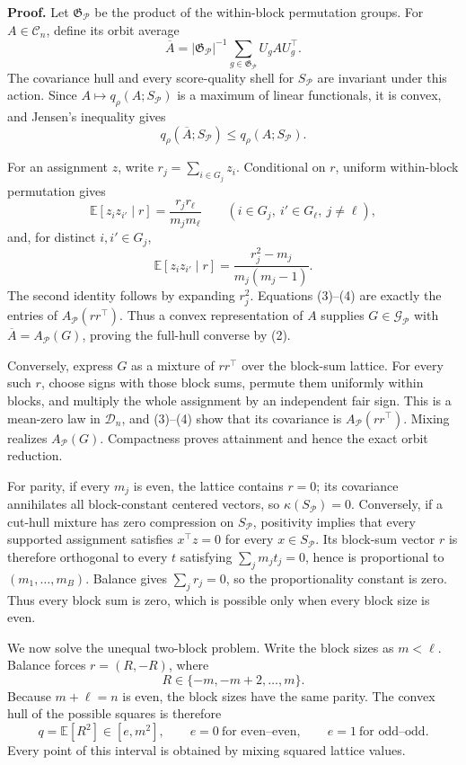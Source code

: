 \textbf{Proof.}
Let \(\mathfrak G_{\mathcal P}\) be the product of the within-block permutation groups.  For \(A\in\mathcal C_n\), define its orbit average
\[
\overline A=|\mathfrak G_{\mathcal P}|^{-1}
\sum_{g\in\mathfrak G_{\mathcal P}}U_gAU_g^\top.
\tag{1}
\]
The covariance hull and every score-quality shell for \(S_{\mathcal P}\) are invariant under this action.  Since \(A\mapsto q_\rho(A;S_{\mathcal P})\) is a maximum of linear functionals, it is convex, and Jensen's inequality gives
\[
q_\rho(\overline A;S_{\mathcal P})\leq q_\rho(A;S_{\mathcal P}).
\tag{2}
\]

For an assignment \(z\), write \(r_j=\sum_{i\in G_j}z_i\).  Conditional on \(r\), uniform within-block permutation gives
\[
\mathbb E[z_i z_{i'}\mid r]=\frac{r_jr_\ell}{m_jm_\ell}
\qquad
(i\in G_j,\ i'\in G_\ell,\ j\ne\ell),
\tag{3}
\]
and, for distinct \(i,i'\in G_j\),
\[
\mathbb E[z_i z_{i'}\mid r]
=\frac{r_j^2-m_j}{m_j(m_j-1)}.
\tag{4}
\]
The second identity follows by expanding \(r_j^2\).  Equations (3)--(4) are exactly the entries of \(A_{\mathcal P}(rr^\top)\).  Thus a convex representation of \(A\) supplies \(G\in\mathcal G_{\mathcal P}\) with \(\overline A=A_{\mathcal P}(G)\), proving the full-hull converse by (2).

Conversely, express \(G\) as a mixture of \(rr^\top\) over the block-sum lattice.  For every such \(r\), choose signs with those block sums, permute them uniformly within blocks, and multiply the whole assignment by an independent fair sign.  This is a mean-zero law in \(\mathcal D_n\), and (3)--(4) show that its covariance is \(A_{\mathcal P}(rr^\top)\).  Mixing realizes \(A_{\mathcal P}(G)\).  Compactness proves attainment and hence the exact orbit reduction.

For parity, if every \(m_j\) is even, the lattice contains \(r=0\); its covariance annihilates all block-constant centered vectors, so \(\kappa(S_{\mathcal P})=0\).  Conversely, if a cut-hull mixture has zero compression on \(S_{\mathcal P}\), positivity implies that every supported assignment satisfies \(x^\top z=0\) for every \(x\in S_{\mathcal P}\).  Its block-sum vector \(r\) is therefore orthogonal to every \(t\) satisfying \(\sum_jm_jt_j=0\), hence is proportional to \((m_1,\ldots,m_B)\).  Balance gives \(\sum_jr_j=0\), so the proportionality constant is zero.  Thus every block sum is zero, which is possible only when every block size is even.

We now solve the unequal two-block problem.  Write the block sizes as \(m<\ell\).  Balance forces \(r=(R,-R)\), where
\[
R\in\{-m,-m+2,\ldots,m\}.
\]
Because \(m+\ell=n\) is even, the block sizes have the same parity.  The convex hull of the possible squares is therefore
\[
q=\mathbb E[R^2]\in[e,m^2],
\qquad
e=0\ \text{for even--even},
\qquad
e=1\ \text{for odd--odd}.
\tag{5}
\]
Every point of this interval is obtained by mixing squared lattice values.

